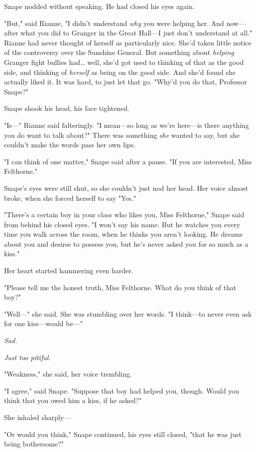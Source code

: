 Snape nodded without speaking. He had closed his eyes again.

"But," said Rianne, "I didn't understand \emph{why} you were helping her. And
now---after what you did to Granger in the Great Hall---I just don't understand
at all." Rianne had never thought of herself as particularly nice. She'd taken
little notice of the controversy over the Sunshine General. But something about
\emph{helping} Granger fight bullies had{\ldots} well, she'd got used to
thinking of that as the good side, and thinking of \emph{herself} as being on
the good side. And she'd found she actually liked it. It was hard, to just let
that go. "Why'd you do that, Professor Snape?"

Snape shook his head, his face tightened.

"Is---" Rianne said falteringly. "I mean---so long as we're here---is there
anything you do want to talk about?" There was something \emph{she} wanted to
say, but she couldn't make the words pass her own lips.

"I can think of one matter," Snape said after a pause. "If you are interested,
Miss Felthorne."

Snape's eyes were still shut, so she couldn't just nod her head. Her voice
almost broke, when she forced herself to say "Yes."

"There's a certain boy in your class who likes you, Miss Felthorne," Snape said
from behind his closed eyes. "I won't say his name. But he watches you every
time you walk across the room, when he thinks you aren't looking. He dreams
about you and desires to possess you, but he's never asked you for so much as a
kiss."

Her heart started hammering even harder.

"Please tell me the honest truth, Miss Felthorne. What do you think of that
boy?"

"Well---" she said. She was stumbling over her words. "I think---to never even
ask for one kiss---would be---"

\emph{Sad.}

\emph{Just too pitiful.}

"Weakness," she said, her voice trembling.

"I agree," said Snape. "Suppose that boy had helped you, though. Would you
think that you owed him a kiss, if he asked?"

She inhaled sharply---

"Or would you think," Snape continued, his eyes still closed, "that he was just
being bothersome?"

